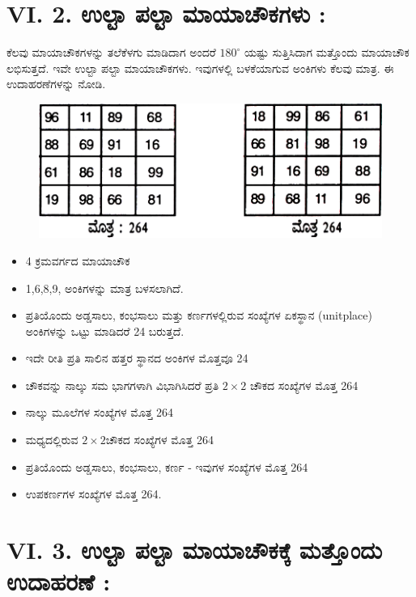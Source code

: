 \section*{VI. 2. ಉಲ್ಟಾ ಪಲ್ಟಾ ಮಾಯಾಚೌಕಗಳು :}

ಕೆಲವು ಮಾಯಾಚೌಕಗಳನ್ನು ತಲೆಕೆಳಗು ಮಾಡಿದಾಗ ಅಂದರೆ $180^\circ$ ಯಷ್ಟು ಸುತ್ತಿಸಿದಾಗ ಮತ್ತೊಂದು ಮಾಯಾಚೌಕ ಲಭಿಸುತ್ತದೆ. ಇವೇ ಉಲ್ಟಾ ಪಲ್ಟಾ ಮಾಯಾಚೌಕಗಳು. ಇವುಗಳಲ್ಲಿ ಬಳಕೆಯಾಗುವ ಅಂಕಿಗಳು ಕೆಲವು ಮಾತ್ರ. ಈ ಉದಾಹರಣೆಗಳನ್ನು ನೋಡಿ.
\begin{figure}[H]
\includegraphics[scale=.9]{src/figures/chap5/fig5-2.jpg}
\end{figure}
\begin{itemize}
	\item 4 ಕ್ರಮವರ್ಗದ ಮಾಯಾಚೌಕ
	\item 1,6,8,9, ಅಂಕಿಗಳನ್ನು ಮಾತ್ರ ಬಳಸಲಾಗಿದೆ.
	\item ಪ್ರತಿಯೊಂದು ಅಡ್ಡಸಾಲು, ಕಂಭಸಾಲು ಮತ್ತು ಕರ್ಣಗಳಲ್ಲಿರುವ ಸಂಖ್ಯೆಗಳ ಏಕಸ್ಥಾನ (unitplace) ಅಂಕಿಗಳನ್ನು ಒಟ್ಟು ಮಾಡಿದರೆ 24 ಬರುತ್ತದೆ.
	\item ಇದೇ ರೀತಿ ಪ್ರತಿ ಸಾಲಿನ ಹತ್ತರ ಸ್ಥಾನದ ಅಂಕಿಗಳ ಮೊತ್ತವೂ 24
	\item ಚೌಕವನ್ನು ನಾಲ್ಕು ಸಮ ಭಾಗಗಳಾಗಿ ವಿಭಾಗಿಸಿದರೆ ಪ್ರತಿ $2 \times 2$ ಚೌಕದ ಸಂಖ್ಯೆಗಳ ಮೊತ್ತ 264
	\item ನಾಲ್ಕು ಮೂಲೆಗಳ ಸಂಖ್ಯೆಗಳ ಮೊತ್ತ 264
	\item ಮಧ್ಯದಲ್ಲಿರುವ $2 \times 2$ಚೌಕದ ಸಂಖ್ಯೆಗಳ ಮೊತ್ತ 264
	\item ಪ್ರತಿಯೊಂದು ಅಡ್ಡಸಾಲು, ಕಂಭಸಾಲು, ಕರ್ಣ - ಇವುಗಳ ಸಂಖ್ಯೆಗಳ ಮೊತ್ತ 264
	\item ಉಪಕರ್ಣಗಳ ಸಂಖ್ಯೆಗಳ ಮೊತ್ತ 264.
\end{itemize}

\section*{VI. 3. ಉಲ್ಟಾ ಪಲ್ಟಾ ಮಾಯಾಚೌಕಕ್ಕೆ ಮತ್ತೊಂದು ಉದಾಹರಣೆ :}


